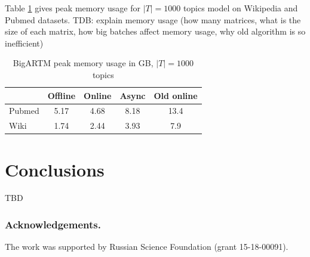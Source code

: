 \documentclass[russian,english]{llncs}
\begin{document}
Table \ref{tab:memory} gives peak memory usage for $|T| = 1000$ topics model on Wikipedia and Pubmed datasets.
TDB: explain memory usage (how many matrices, what is the size of each matrix, how big batches affect memory usage, why old algorithm is so inefficient)

\begin{table}[h]
	\caption{
		BigARTM peak memory usage in GB, $|T| = 1000$ topics
	}
	\label{tab:memory}
	\centering\tabcolsep=4.3pt
	\begin{tabular}[t]{|l|cccc|}
		\hline
		& Offline   & Online    & Async     & Old online  \\
		\hline
		Pubmed	& {5.17}   	& {4.68}   	& {8.18}   	& {13.4}      \\
		Wiki	& {1.74}   	& {2.44}   	& {3.93}   	& {7.9}       \\ 
		\hline
	\end{tabular}
\end{table}



\section{Conclusions}
\label{sec:Conclusions}

TBD

\bigskip
\subsubsection*{Acknowledgements.}
\nopagebreak
The work was supported by Russian Science Foundation (grant 15-18-00091).

%
%
\end{document}
